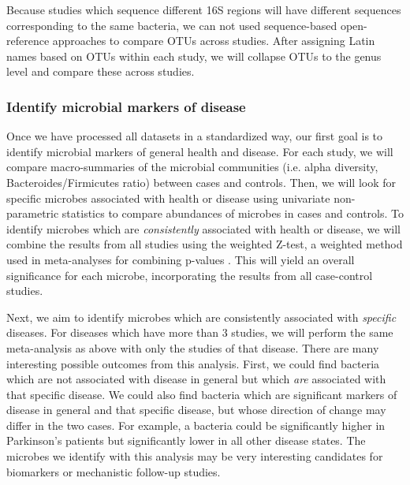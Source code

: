 \documentclass[12pt]{article}
\begin{document}
Because studies which sequence different 16S regions will have 
different sequences corresponding to the same bacteria, we can not 
used sequence-based open-reference approaches to compare OTUs across 
studies. After assigning Latin names based on OTUs within each study, 
we will collapse OTUs to the genus level and compare these across 
studies.

\subsubsection{Identify microbial markers of disease}\label{sec:indep_studies}
Once we have processed all datasets in a standardized way, our first 
goal is to identify microbial markers of general health and disease. 
For each study, we will compare macro-summaries of the microbial communities
(i.e. alpha diversity, Bacteroides/Firmicutes ratio) between cases and controls.
Then, we will look for specific microbes associated with health or disease using
univariate non-parametric statistics to compare abundances of microbes in cases
and controls. To identify microbes which are \textit{consistently} associated with
health or disease, we will combine the results from all studies using 
the weighted Z-test, a weighted method used in meta-analyses for combining p-values \cite{zavkin-ztest-2011}. 
This will yield an overall significance for each microbe,
incorporating the results from all case-control studies.

Next, we aim to identify microbes which are consistently associated with \textit{specific}
diseases. For diseases which have more than 3 studies, we will
perform the same meta-analysis as above with only the studies
of that disease. There are many interesting possible outcomes from this analysis.
First, we could find bacteria which are not associated with disease in general 
but which \textit{are} associated with that specific disease. 
We could also find bacteria which are significant markers of disease in general and 
that specific disease, but whose direction of change may differ in the two cases.
For example, a bacteria could be significantly higher in Parkinson's patients but
significantly lower in all other disease states. The microbes we identify with this
analysis may be very interesting candidates for biomarkers or mechanistic follow-up studies.
\end{document}
